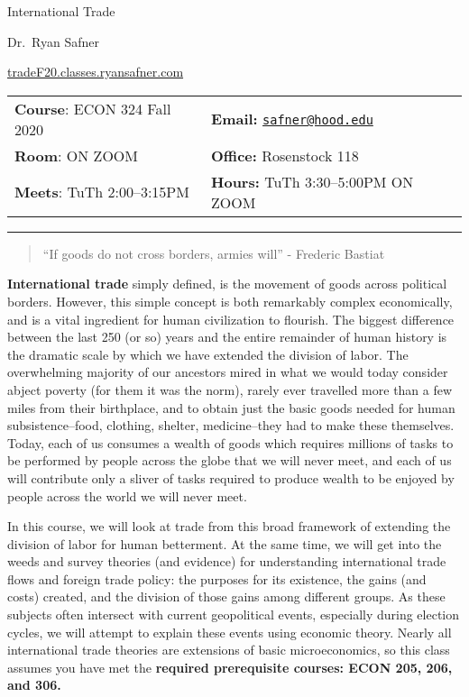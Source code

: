 \documentclass{article}
\begin{document}
\sffamily

\centerline{\Huge International Trade}

\vspace{3 mm}

\centerline{\large Dr.~Ryan Safner}
\vspace{2 mm}
\centerline{\large \href{http://tradeF20.classes.ryansafner.com}{tradeF20.classes.ryansafner.com}}

\vspace{5 mm}

\begin{tabular}{@{}p{3.5in}p{3.5in}}           
\textbf{Course}: ECON 324 Fall 2020  & \textbf{Email:}  \href{mailto:safner@hood.edu}{\nolinkurl{safner@hood.edu}}\\
\textbf{Room}: ON ZOOM & \textbf{Office:}  Rosenstock 118\\
\textbf{Meets}: TuTh 2:00--3:15PM & \textbf{Hours:} TuTh 3:30--5:00PM ON ZOOM\\ 
\end{tabular}

\vspace{5 mm}

\hrule


\begin{quote}
``If goods do not cross borders, armies will'' - Frederic Bastiat
\end{quote}

\textbf{International trade} simply defined, is the movement of goods
across political borders. However, this simple concept is both
remarkably complex economically, and is a vital ingredient for human
civilization to flourish. The biggest difference between the last 250
(or so) years and the entire remainder of human history is the dramatic
scale by which we have extended the division of labor. The overwhelming
majority of our ancestors mired in what we would today consider abject
poverty (for them it was the norm), rarely ever travelled more than a
few miles from their birthplace, and to obtain just the basic goods
needed for human subsistence--food, clothing, shelter, medicine--they
had to make these themselves. Today, each of us consumes a wealth of
goods which requires millions of tasks to be performed by people across
the globe that we will never meet, and each of us will contribute only a
sliver of tasks required to produce wealth to be enjoyed by people
across the world we will never meet.

In this course, we will look at trade from this broad framework of
extending the division of labor for human betterment. At the same time,
we will get into the weeds and survey theories (and evidence) for
understanding international trade flows and foreign trade policy: the
purposes for its existence, the gains (and costs) created, and the
division of those gains among different groups. As these subjects often
intersect with current geopolitical events, especially during election
cycles, we will attempt to explain these events using economic theory.
Nearly all international trade theories are extensions of basic
microeconomics, so this class assumes you have met the \textbf{required
prerequisite courses: ECON 205, 206, and 306.}
\end{document}
